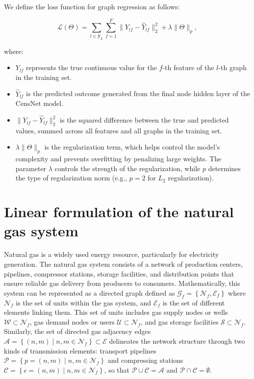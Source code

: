 We define the loss function for graph regression as follows:

\begin{equation}
    \mathcal{L}(\Theta) = \sum_{l \in \mathcal{Y}_L} \sum_{f=1}^{F} \| Y_{lf} - \hat{Y}_{lf} \|^2_2 + \lambda \|\Theta\|_p,
\end{equation}

where:

\begin{itemize}
    \item \( Y_{lf} \) represents the true continuous value for the \( f \)-th feature of the \( l \)-th graph in the training set.
    \item \( \hat{Y}_{lf} \) is the predicted outcome generated from the final node hidden layer of the CensNet model.
    \item \( \| Y_{lf} - \hat{Y}_{lf} \|^2_2 \) is the squared difference between the true and predicted values, summed across all features and all graphs in the training set.
    \item \( \lambda \|\Theta\|_p \) is the regularization term, which helps control the model's complexity and prevents overfitting by penalizing large weights. The parameter \( \lambda \) controls the strength of the regularization, while \( p \) determines the type of regularization norm (e.g., \( p=2 \) for \( L_2 \) regularization).
\end{itemize}



\section{Linear formulation of the natural gas system} \label{sec:LinealCensnet_formulation}


Natural gas is a widely used energy resource, particularly for electricity generation. The natural gas system consists of a network of production centers, pipelines, compressor stations, storage facilities, and distribution points that ensure reliable gas delivery from producers to consumers. Mathematically, this system can be represented as a directed graph defined as $\mathcal{G}_f = \left\{\mathcal{N}_f, \mathcal{E}_f\right\}$ where $\mathcal{N}_f$ is the set of units within the gas system, and $ \mathcal{E}_f$ is the set of different elements linking them. This set of units includes gas supply nodes or wells $\mathcal{W} \subset \mathcal{N}_{f}$, gas demand nodes or users $\mathcal{U} \subset \mathcal{N}_{f}$, and gas storage facilities $\mathcal{S} \subset \mathcal{N}_{f}$. Similarly, the set of directed gas adjacency edges $\mathcal{A} = \left\{(n,m) \mid n,m\in\mathcal{N}_f \right\} \subset \mathcal{E}$ delineates the network structure through two kinds of transmission elements: transport pipelines $\mathcal{P} = \left\{p=(n,m) \mid n,m\in\mathcal{N}_f \right\}$ and compressing stations $\mathcal{C} = \left\{c=(n,m) \mid n,m\in\mathcal{N}_f \right\}$, so that $\mathcal{P}\cup\mathcal{C}=\mathcal{A}$ and $\mathcal{P}\cap\mathcal{C}=\emptyset$.


